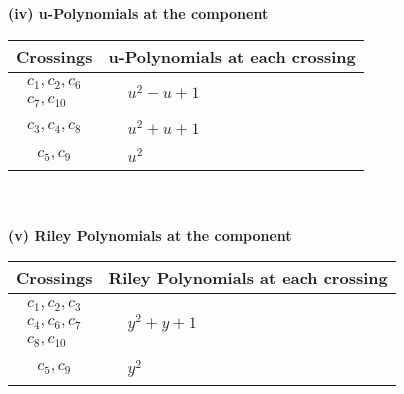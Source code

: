 \documentclass[1p]{elsarticle_modified}
\theoremstyle{definition}
\begin{document}
\newpage\renewcommand{\arraystretch}{1}
\flushleft \textbf{(iv) u-Polynomials at the component}\newline \\
\begin{tabular}{m{50pt}|m{274pt}}
Crossings & \hspace{64pt}u-Polynomials at each crossing \\
\hline $$\begin{aligned}c_{1},c_{2},c_{6}\\c_{7},c_{10}\end{aligned}$$&$\begin{aligned}
&u^2- u+1
\end{aligned}$\\
\hline $$\begin{aligned}c_{3},c_{4},c_{8}\end{aligned}$$&$\begin{aligned}
&u^2+u+1
\end{aligned}$\\
\hline $$\begin{aligned}c_{5},c_{9}\end{aligned}$$&$\begin{aligned}
&u^2
\end{aligned}$\\
\hline
\end{tabular}\\~\\
\newpage\renewcommand{\arraystretch}{1}
\flushleft \textbf{(v) Riley Polynomials at the component}\newline \\
\begin{tabular}{m{50pt}|m{274pt}}
Crossings & \hspace{64pt}Riley Polynomials at each crossing \\
\hline $$\begin{aligned}c_{1},c_{2},c_{3}\\c_{4},c_{6},c_{7}\\c_{8},c_{10}\end{aligned}$$&$\begin{aligned}
&y^2+y+1
\end{aligned}$\\
\hline $$\begin{aligned}c_{5},c_{9}\end{aligned}$$&$\begin{aligned}
&y^2
\end{aligned}$\\
\hline
\end{tabular}\\~\\
\end{document}
